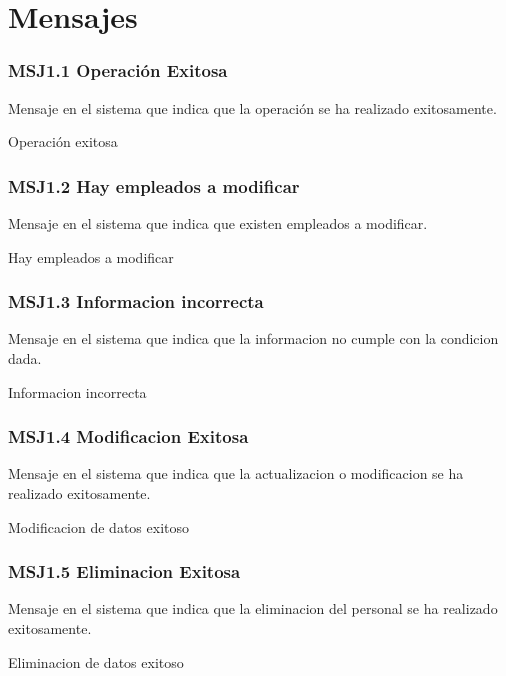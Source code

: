 \chapter{Mensajes}
\label{appendix:Mensajes}



\subsection{MSJ1.1 Operación Exitosa }

Mensaje en el sistema que indica que la operación se ha realizado exitosamente.

  \noindent Operación exitosa

\subsection{MSJ1.2 Hay empleados a modificar }

Mensaje en el sistema que indica que existen empleados a modificar.

  \noindent Hay empleados a modificar
  \subsection{MSJ1.3 Informacion incorrecta }
Mensaje en el sistema que indica que la informacion no cumple con la condicion dada.

  \noindent Informacion incorrecta
  \subsection{MSJ1.4 Modificacion Exitosa }

Mensaje en el sistema que indica que la actualizacion o modificacion se ha realizado exitosamente.

  \noindent Modificacion de datos exitoso
  \subsection{MSJ1.5 Eliminacion Exitosa }

Mensaje en el sistema que indica que la eliminacion del personal se ha realizado exitosamente.

  \noindent Eliminacion de datos exitoso


